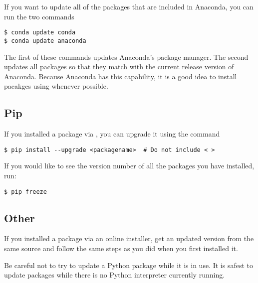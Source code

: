 If you want to update all of the packages that are included in Anaconda, you can run the two commands
\begin{lstlisting}[style=ShellInput]
$ conda update conda
$ conda update anaconda
\end{lstlisting}
The first of these commands updates Anaconda's package manager.
The second updates all packages so that they match with the current release version of Anaconda. Because Anaconda has this capability, it is a good idea to install pacakges using  whenever possible.

\subsection*{Pip}

If you installed a package via , you can upgrade it using the command
\begin{lstlisting}
$ pip install --upgrade <packagename>  # Do not include < >
\end{lstlisting}

If you would like to see the version number of all the packages you have installed, run:

\begin{lstlisting}[style=ShellInput]
$ pip freeze
\end{lstlisting}

\subsection*{Other}

If you installed a package via an online installer, get an updated version from
the same source and follow the same steps as you did when you first installed it.

\begin{warn}
Be careful not to try to update a Python package while it is in use.
It is safest to update packages while there is no Python interpreter currently running.
\end{warn}
